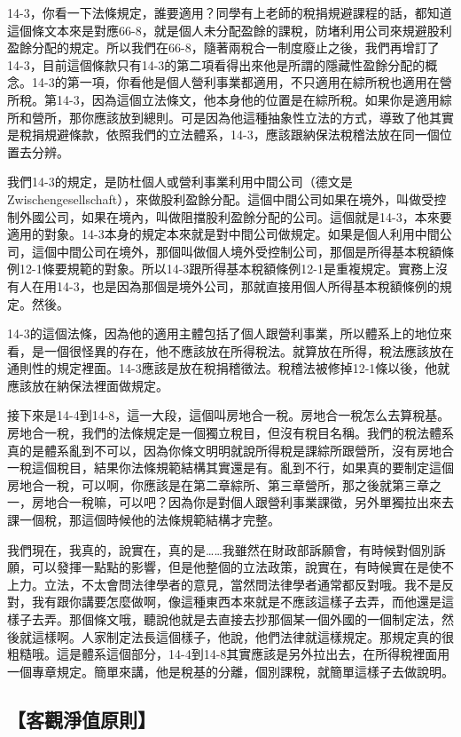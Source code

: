 \documentclass[oneside,sub3section]{ctexbook}
\begin{document}
14-3，你看一下法條規定，誰要適用？同學有上老師的稅捐規避課程的話，都知道這個條文本來是對應66-8，就是個人未分配盈餘的課稅，防堵利用公司來規避股利盈餘分配的規定。所以我們在66-8，隨著兩稅合一制度廢止之後，我們再增訂了14-3，目前這個條款只有14-3的第二項看得出來他是所謂的隱藏性盈餘分配的概念。14-3的第一項，你看他是個人營利事業都適用，不只適用在綜所稅也適用在營所稅。第14-3，因為這個立法條文，他本身他的位置是在綜所稅。如果你是適用綜所和營所，那你應該放到總則。可是因為他這種抽象性立法的方式，導致了他其實是稅捐規避條款，依照我們的立法體系，14-3，應該跟納保法稅稽法放在同一個位置去分辨。

我們14-3的規定，是防杜個人或營利事業利用中間公司（德文是Zwischengesellschaft），來做股利盈餘分配。這個中間公司如果在境外，叫做受控制外國公司，如果在境內，叫做阻擋股利盈餘分配的公司。這個就是14-3，本來要適用的對象。14-3本身的規定本來就是對中間公司做規定。如果是個人利用中間公司，這個中間公司在境外，那個叫做個人境外受控制公司，那個是所得基本稅額條例12-1條要規範的對象。所以14-3跟所得基本稅額條例12-1是重複規定。實務上沒有人在用14-3，也是因為那個是境外公司，那就直接用個人所得基本稅額條例的規定。然後。

14-3的這個法條，因為他的適用主體包括了個人跟營利事業，所以體系上的地位來看，是一個很怪異的存在，他不應該放在所得稅法。就算放在所得，稅法應該放在通則性的規定裡面。14-3應該是放在稅捐稽徵法。稅稽法被修掉12-1條以後，他就應該放在納保法裡面做規定。

接下來是14-4到14-8，這一大段，這個叫房地合一稅。房地合一稅怎么去算稅基。房地合一稅，我們的法條規定是一個獨立稅目，但沒有稅目名稱。我們的稅法體系真的是體系亂到不可以，因為你條文明明就說所得稅是課綜所跟營所，沒有房地合一稅這個稅目，結果你法條規範結構其實還是有。亂到不行，如果真的要制定這個房地合一稅，可以啊，你應該是在第二章綜所、第三章營所，那之後就第三章之一，房地合一稅嘛，可以吧？因為你是對個人跟營利事業課徵，另外單獨拉出來去課一個稅，那這個時候他的法條規範結構才完整。

我們現在，我真的，說實在，真的是\ldots\ldots 我雖然在財政部訴願會，有時候對個別訴願，可以發揮一點點的影響，但是他整個的立法政策，說實在，有時候實在是使不上力。立法，不太會問法律學者的意見，當然問法律學者通常都反對哦。我不是反對，我有跟你講要怎麼做啊，像這種東西本來就是不應該這樣子去弄，而他還是這樣子去弄。那個條文哦，聽說他就是去直接去抄那個某一個外國的一個制定法，然後就這樣啊。人家制定法長這個樣子，他說，他們法律就這樣規定。那規定真的很粗糙哦。這是體系這個部分，14-4到14-8其實應該是另外拉出去，在所得稅裡面用一個專章規定。簡單來講，他是稅基的分離，個別課稅，就簡單這樣子去做說明。

\hypertarget{ux5ba2ux89c0ux6de8ux503cux539fux5247}{%
\subsection{【客觀淨值原則】}\label{ux5ba2ux89c0ux6de8ux503cux539fux5247}}
\end{document}
